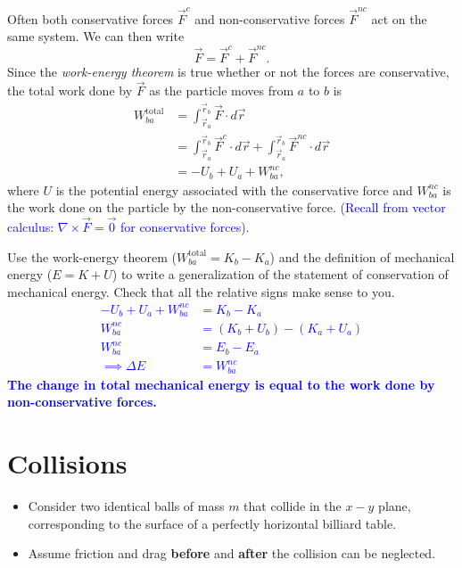 \documentclass[11pt, letterpaper, openany]{book}
\newenvironment{exercise}[1][Exercise]{%
  \tcolorbox[blanker, breakable, left=1em,
    before skip=1em, after skip=1em,
    borderline west={3pt}{0pt}{PhysNavy},
    colback=PhysCream,
    before upper={\textcolor{PhysNavy}{\sffamily\bfseries #1:}\space}
  ]%
}{%
  \endtcolorbox%
}
\begin{document}
Often both conservative forces $\vec{F}^c$ and non-conservative forces $\vec{F}^{nc}$ act on the same system. We can then write
\[ \vec{F} = \vec{F}^c + \vec{F}^{nc}. \]
Since the \textit{work-energy theorem} is true whether or not the forces are conservative, the total work done by $\vec{F}$ as the particle moves from $a$ to $b$ is
\begin{align*}
    W_{ba}^{\text{total}} &= \int_{\vec{r}_a}^{\vec{r}_b} \vec{F} \cdot d\vec{r} \\
    &= \int_{\vec{r}_a}^{\vec{r}_b} \vec{F}^c \cdot d\vec{r} + \int_{\vec{r}_a}^{\vec{r}_b} \vec{F}^{nc} \cdot d\vec{r} \\
    &= -U_b + U_a + W_{ba}^{nc},
\end{align*}
where $U$ is the potential energy associated with the conservative force and $W_{ba}^{nc}$ is the work done on the particle by the non-conservative force. \textcolor{blue}{(Recall from vector calculus: $\nabla \times \vec{F} = \vec{0}$ for conservative forces).}

\begin{exercise}[Quick Exercise 7]
Use the work-energy theorem ($W_{ba}^{\text{total}} = K_b - K_a$) and the definition of mechanical energy ($E = K + U$) to write a generalization of the statement of conservation of mechanical energy. Check that all the relative signs make sense to you. \\
\textcolor{blue}{
\begin{align*}
    -U_b + U_a + W_{ba}^{nc} &= K_b - K_a \\
    W_{ba}^{nc} &= (K_b + U_b) - (K_a + U_a) \\
    W_{ba}^{nc} &= E_b - E_a \\
    \implies \Delta E &= W_{ba}^{nc}
\end{align*}
\textbf{The change in total mechanical energy is equal to the work done by non-conservative forces.}
}
\end{exercise}

\section*{Collisions}

\begin{itemize}
    \item Consider two identical balls of mass $m$ that collide in the $x-y$ plane, corresponding to the surface of a perfectly horizontal billiard table.
    \item Assume friction and drag \textbf{before} and \textbf{after} the collision can be neglected.
\end{itemize}
\end{document}
